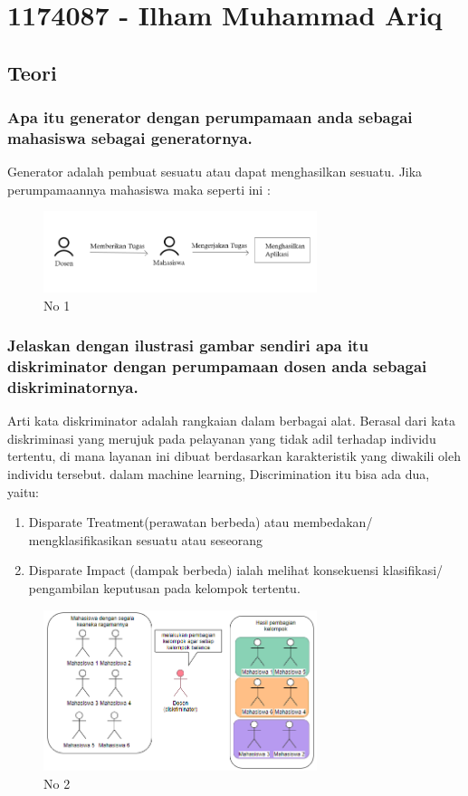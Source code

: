 \section{1174087 - Ilham Muhammad Ariq}
\subsection{Teori}
\subsubsection{Apa itu generator dengan perumpamaan anda sebagai mahasiswa sebagai generatornya.}
\hfill\break
Generator adalah pembuat sesuatu atau dapat menghasilkan sesuatu. Jika perumpamaannya mahasiswa maka seperti ini :
\begin{figure}[H]
	\centering
	\includegraphics[width=8cm]{figures/1174087/8/1.png}
	\caption{No 1}
\end{figure}

\subsubsection{Jelaskan dengan ilustrasi gambar sendiri apa itu diskriminator dengan perumpamaan dosen anda sebagai diskriminatornya.}
\hfill\break
Arti kata diskriminator adalah rangkaian dalam berbagai alat. Berasal dari kata diskriminasi yang merujuk pada pelayanan yang tidak adil terhadap individu tertentu, di mana layanan ini dibuat berdasarkan karakteristik yang diwakili oleh individu tersebut. dalam machine learning, Discrimination itu bisa ada dua, yaitu:
\begin{enumerate}
\item Disparate Treatment(perawatan berbeda) atau membedakan/ mengklasifikasikan sesuatu atau seseorang
\item Disparate Impact (dampak berbeda) ialah melihat konsekuensi klasifikasi/ pengambilan keputusan pada kelompok tertentu.
\end{enumerate}
\begin{figure}[H]
	\centering
	\includegraphics[width=8cm]{figures/1174087/8/2.png}
	\caption{No 2}
\end{figure}


